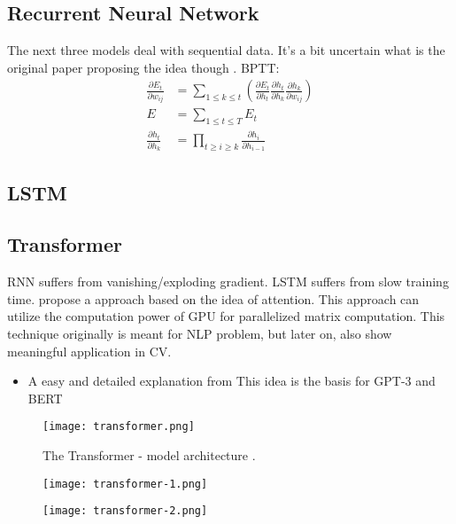 \subsection{Recurrent Neural Network}
The next three models deal with sequential data. It's a bit uncertain what is the original paper proposing the idea though \cite{elman1990finding}. \ac{BPTT}:\\
\begin{align}
	\frac{\partial E_t}{\partial w_{ij}} &= \sum_{1 \leq k \leq t} \left( \frac{\partial E_t}{\partial h_t} \frac{\partial h_t}{\partial h_k} \frac{\partial h_k}{\partial w_{ij}} \right)\\
	E &= \sum_{1 \leq t \leq T} E_t\\
	\frac{\partial h_t}{\partial h_k} &= \prod_{t \geq i \geq k} \frac{\partial h_i}{\partial h_{i-1}}
\end{align}

\subsection{LSTM}
\cite{sutskever2014sequence} \todo{}

\subsection{Transformer}
\ac{RNN} suffers from vanishing/exploding gradient. \ac{LSTM} suffers from slow training time.  propose a approach based on the idea of attention. This approach can utilize the computation power of \ac{GPU} for parallelized matrix computation. This technique originally is meant for \ac{NLP} problem, but later on, also show meaningful application in \ac{CV}.

\begin{itemize}
	\item A easy and detailed explanation from 
	This idea is the basis for GPT-3 \cite{brown2020language} and BERT \cite{devlin2018bert}
\end{itemize}
\begin{figure}[hbt!]
	\centering
	\texttt{[image: transformer.png]}
	\caption{The Transformer - model architecture \cite{vaswani2017attention}.}
\end{figure}

\begin{figure}[hbt!]
	\centering
	\begin{minipage}{.5\textwidth}
		\centering
		\texttt{[image: transformer-1.png]}
	\end{minipage}%
	\begin{minipage}{.45\textwidth}
		\centering
		\texttt{[image: transformer-2.png]}
	\end{minipage}
\end{figure}

